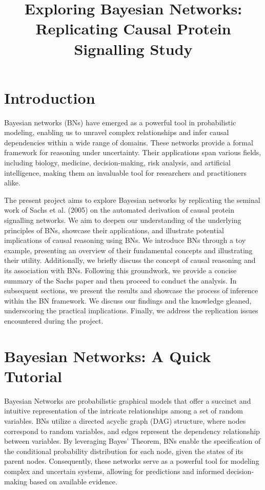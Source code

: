 \documentclass[twocol]{ametsoc}
\title{Exploring Bayesian Networks: Replicating Causal Protein
Signalling Study}
\affiliation{Applied Mathematics, University of Colorado Boulder}
\begin{document}
\maketitle
\hypertarget{introduction}{%
\section{Introduction}\label{introduction}}

Bayesian networks (BNs) have emerged as a powerful tool in probabilistic
modeling, enabling us to unravel complex relationships and infer causal
dependencies within a wide range of domains. These networks provide a
formal framework for reasoning under uncertainty. Their applications
span various fields, including biology, medicine, decision-making, risk
analysis, and artificial intelligence, making them an invaluable tool
for researchers and practitioners alike.

The present project aims to explore Bayesian networks by replicating the
seminal work of Sachs et al. (2005) on the automated derivation of
causal protein signalling networks. We aim to deepen our understanding
of the underlying principles of BNs, showcase their applications, and
illustrate potential implications of causal reasoning using BNs. We
introduce BNs through a toy example, presenting an overview of their
fundamental concepts and illustrating their utility. Additionally, we
briefly discuss the concept of causal reasoning and its association with
BNs. Following this groundwork, we provide a concise summary of the
Sachs paper and then proceed to conduct the analysis. In subsequent
sections, we present the results and showcase the process of inference
within the BN framework. We discuss our findings and the knowledge
gleaned, underscoring the practical implications. Finally, we address
the replication issues encountered during the project.

\hypertarget{bayesian-networks-a-quick-tutorial}{%
\section{Bayesian Networks: A Quick
Tutorial}\label{bayesian-networks-a-quick-tutorial}}

Bayesian Networks are probabilistic graphical models that offer a
succinct and intuitive representation of the intricate relationships
among a set of random variables. BNs utilize a directed acyclic graph
(DAG) structure, where nodes correspond to random variables, and edges
represent the dependency relationship between variables. By leveraging
Bayes' Theorem, BNs enable the specification of the conditional
probability distribution for each node, given the states of its parent
nodes. Consequently, these networks serve as a powerful tool for
modeling complex and uncertain systems, allowing for predictions and
informed decision-making based on available evidence.
\end{document}
